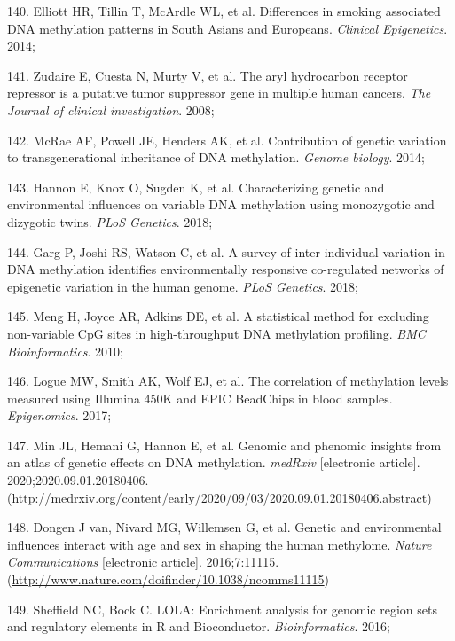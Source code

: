 \documentclass[11pt,oneside]{bristolthesis}
\newenvironment{cslreferences}%
  {}%
  {\par}
\begin{document}
\begin{cslreferences}
\leavevmode\hypertarget{ref-Elliott2014}{}%
140. Elliott HR, Tillin T, McArdle WL, et al. Differences in smoking associated DNA methylation patterns in South Asians and Europeans. \emph{Clinical Epigenetics}. 2014;

\leavevmode\hypertarget{ref-Zudaire2008}{}%
141. Zudaire E, Cuesta N, Murty V, et al. The aryl hydrocarbon receptor repressor is a putative tumor suppressor gene in multiple human cancers. \emph{The Journal of clinical investigation}. 2008;

\leavevmode\hypertarget{ref-McRae2014}{}%
142. McRae AF, Powell JE, Henders AK, et al. Contribution of genetic variation to transgenerational inheritance of DNA methylation. \emph{Genome biology}. 2014;

\leavevmode\hypertarget{ref-Hannon2018}{}%
143. Hannon E, Knox O, Sugden K, et al. Characterizing genetic and environmental influences on variable DNA methylation using monozygotic and dizygotic twins. \emph{PLoS Genetics}. 2018;

\leavevmode\hypertarget{ref-Garg2018}{}%
144. Garg P, Joshi RS, Watson C, et al. A survey of inter-individual variation in DNA methylation identifies environmentally responsive co-regulated networks of epigenetic variation in the human genome. \emph{PLoS Genetics}. 2018;

\leavevmode\hypertarget{ref-Meng2010}{}%
145. Meng H, Joyce AR, Adkins DE, et al. A statistical method for excluding non-variable CpG sites in high-throughput DNA methylation profiling. \emph{BMC Bioinformatics}. 2010;

\leavevmode\hypertarget{ref-Logue2017}{}%
146. Logue MW, Smith AK, Wolf EJ, et al. The correlation of methylation levels measured using Illumina 450K and EPIC BeadChips in blood samples. \emph{Epigenomics}. 2017;

\leavevmode\hypertarget{ref-Min2020}{}%
147. Min JL, Hemani G, Hannon E, et al. Genomic and phenomic insights from an atlas of genetic effects on DNA methylation. \emph{medRxiv} {[}electronic article{]}. 2020;2020.09.01.20180406. (\url{http://medrxiv.org/content/early/2020/09/03/2020.09.01.20180406.abstract})

\leavevmode\hypertarget{ref-VanDongen2016}{}%
148. Dongen J van, Nivard MG, Willemsen G, et al. Genetic and environmental influences interact with age and sex in shaping the human methylome. \emph{Nature Communications} {[}electronic article{]}. 2016;7:11115. (\url{http://www.nature.com/doifinder/10.1038/ncomms11115})

\leavevmode\hypertarget{ref-Sheffield2016}{}%
149. Sheffield NC, Bock C. LOLA: Enrichment analysis for genomic region sets and regulatory elements in R and Bioconductor. \emph{Bioinformatics}. 2016;


\end{cslreferences}
\end{document}
